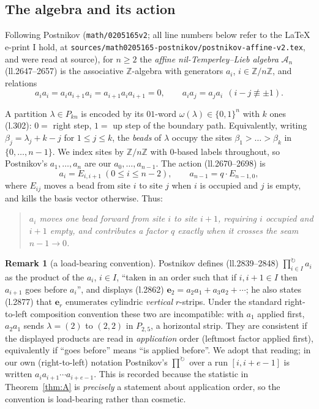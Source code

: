 \documentclass[11pt]{article}
\theoremstyle{plain}
\theoremstyle{definition}
\newtheorem{remark}[theorem]{Remark}
\newcommand{\A}{\mathscr{A}}
\newcommand{\ZZ}{\mathbb{Z}}
\begin{document}
\subsection{The algebra and its action}

Following Postnikov \cite{Pos} (\texttt{math/0205165v2}; all line numbers
below refer to the \LaTeX{} e-print I hold, at
\texttt{sources/math0205165-postnikov/postnikov-affine-v2.tex}, and were
read at source), for $n\ge 2$ the \emph{affine nil-Temperley--Lieb
algebra} $\A_n$ (ll.2647--2657) is the associative $\ZZ$-algebra with
generators $a_i$, $i\in\ZZ/n\ZZ$, and relations
\begin{equation}\label{eq:rel}
a_ia_i=a_ia_{i+1}a_i=a_{i+1}a_ia_{i+1}=0,\qquad
a_ia_j=a_ja_i\ \ (i-j\not\equiv\pm1).
\end{equation}

A partition $\lambda\in P_{kn}$ is encoded by its $01$-word
$\omega(\lambda)\in\{0,1\}^n$ with $k$ ones (l.302): $0=$ right step,
$1=$ up step of the boundary path.  Equivalently, writing
$\beta_j=\lambda_j+k-j$ for $1\le j\le k$, the \emph{beads} of $\lambda$
occupy the sites $\beta_1>\dots>\beta_k$ in $\{0,\dots,n-1\}$.  We index
sites by $\ZZ/n\ZZ$ with $0$-based labels throughout, so Postnikov's
$a_1,\dots,a_n$ are our $a_0,\dots,a_{n-1}$.  The action (ll.2670--2698)
is
\[
a_i=E_{i,i+1}\ (0\le i\le n-2),\qquad a_{n-1}=q\cdot E_{n-1,0},
\]
where $E_{ij}$ moves a bead from site $i$ to site $j$ when $i$ is
occupied and $j$ is empty, and kills the basis vector otherwise.  Thus:

\begin{quote}
\emph{$a_i$ moves one bead forward from site $i$ to site $i+1$, requiring
$i$ occupied and $i+1$ empty, and contributes a factor $q$ exactly when
it crosses the seam $n-1\to 0$.}
\end{quote}

\begin{remark}[a load-bearing convention]\label{rem:conv}
Postnikov defines (ll.2839--2848) $\prod^{\circlearrowright}_{i\in I}a_i$
as the product of the $a_i$, $i\in I$, ``taken in an order such that if
$i,i+1\in I$ then $a_{i+1}$ goes before $a_i$'', and displays
(l.2862) $\mathbf e_2=a_2a_1+a_3a_2+\cdots$; he also states (l.2877) that
$\mathbf e_r$ enumerates cylindric \emph{vertical} $r$-strips.  Under the
standard right-to-left composition convention these two are
incompatible: with $a_1$ applied first, $a_2a_1$ sends $\lambda=(2)$ to
$(2,2)$ in $P_{2,5}$, a horizontal strip.  They are consistent if the
displayed products are read in \emph{application} order (leftmost factor
applied first), equivalently if ``goes before'' means ``is applied
before''.  We adopt that reading; in our own (right-to-left) notation
Postnikov's $\prod^{\circlearrowright}$ over a run $[i,i+e-1]$ is written
$a_i a_{i+1}\cdots a_{i+e-1}$.  This is recorded because the statistic in
Theorem~\ref{thm:A} is \emph{precisely} a statement about application
order, so the convention is load-bearing rather than cosmetic.
\end{remark}
\end{document}
